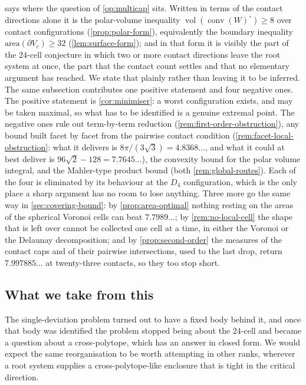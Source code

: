 \documentclass[11pt,reqno]{amsart}
\renewcommand{\_}{\origunderscore\allowbreak}
\numberwithin{equation}{section}
\theoremstyle{plain}
\theoremstyle{definition}
\theoremstyle{remark}
\DeclareMathOperator{\vol}{vol}
\DeclareMathOperator{\conv}{conv}
\begin{document}
 says where the question of \cref{op:multicap}
sits. Written in terms of the contact directions alone it is the
polar-volume inequality $\vol(\conv(W)^{\circ})\ge8$ over contact
configurations (\cref{prop:polar-form}), equivalently the boundary
inequality $\mathrm{area}(\partial V_c)\ge32$ (\cref{lem:surface-form});
and in that form it is visibly the part of the $24$-cell conjecture in
which two or more contact directions leave the root system at once, the
part that the contact count settles and that no elementary argument has
reached. We state that plainly rather than leaving it to be inferred. The same subsection
contributes one positive statement and four negative ones. The positive
statement is \cref{cor:minimiser}: a worst configuration exists, and may
be taken maximal, so what has to be identified is a genuine extremal
point. The negative ones rule out term-by-term reduction
(\cref{rem:first-order-obstruction}), any bound built facet by facet
from the pairwise contact condition
(\cref{rem:facet-local-obstruction}: what it delivers is
$8\pi/(3\sqrt3)=4.8368\ldots$, and what it could at best deliver is
$96\sqrt2-128=7.7645\ldots$), the convexity bound for the
polar volume integral, and the Mahler-type product bound (both
\cref{rem:global-routes}). Each of the four is eliminated by its
behaviour at the $D_4$ configuration, which is the only place a sharp
argument has no room to lose anything. Three more go the same way in
\cref{sec:covering-bound}: by \cref{prop:area-optimal} nothing resting on
the areas of the spherical Voronoi cells can beat $7.7989\ldots$; by
\cref{rem:no-local-cell} the shape that is left over cannot be collected
one cell at a time, in either the Voronoi or the Delaunay decomposition;
and by \cref{prop:second-order} the measures of the contact caps and of
their pairwise intersections, used to the last drop, return
$7.997885\ldots$ at twenty-three contacts, so they too stop short.

\subsection{What we take from this}

The single-deviation problem turned out to have a fixed body behind it,
and once that body was identified the problem stopped being about the
$24$-cell and became a question about a cross-polytope, which has an
answer in closed form. We would expect the same reorganisation to be
worth attempting in other ranks, wherever a root system supplies a
cross-polytope-like enclosure that is tight in the critical direction.
\end{document}
